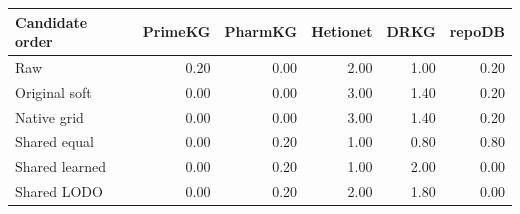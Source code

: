 \begin{tabular}{lrrrrr}
\toprule
Candidate order & PrimeKG & PharmKG & Hetionet & DRKG & repoDB \\
\midrule
Raw & 0.20 & 0.00 & 2.00 & 1.00 & 0.20 \\
Original soft & 0.00 & 0.00 & 3.00 & 1.40 & 0.20 \\
Native grid & 0.00 & 0.00 & 3.00 & 1.40 & 0.20 \\
Shared equal & 0.00 & 0.20 & 1.00 & 0.80 & 0.80 \\
Shared learned & 0.00 & 0.20 & 1.00 & 2.00 & 0.00 \\
Shared LODO & 0.00 & 0.20 & 2.00 & 1.80 & 0.00 \\
\bottomrule
\end{tabular}
